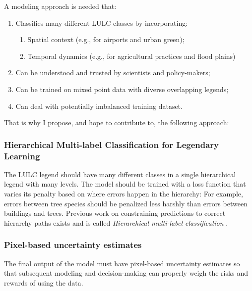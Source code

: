         A modeling approach is needed that:
        \begin{enumerate}
            \item Classifies many different LULC classes by incorporating:
            \begin{enumerate}
                \item Spatial context (e.g., for airports and urban green);
                \item Temporal dynamics (e.g., for agricultural practices and flood plains)
            \end{enumerate}
            \item Can be understood and trusted by scientists and policy-makers;
            \item Can be trained on mixed point data with diverse overlapping legends;
            \item Can deal with potentially imbalanced training dataset.
        \end{enumerate}

        That is why I propose, and hope to contribute to, the following approach:

        \subsubsection{Hierarchical Multi-label Classification for Legendary Learning}
            The LULC legend should have many different classes in a single hierarchical legend with many levels. The model should be trained with a loss function that varies its penalty based on where errors happen in the hierarchy: For example, errors between tree species should be penalized less harshly than errors between buildings and trees. Previous work on constraining predictions to correct hierarchy paths exists and is called \textit{Hierarchical multi-label classification} \citep{wehrmann2018hierarchical}.

        \subsubsection{Pixel-based uncertainty estimates}
            The final output of the model must have pixel-based uncertainty estimates so that subsequent modeling and decision-making can properly weigh the risks and rewards of using the data.

